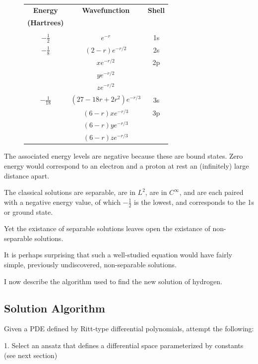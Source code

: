 \documentclass{article}
\begin{document}
\begin{figure}
\begin{center}
\begin{tabular}{ccc}
{\bf Energy}		& {\bf Wavefunction}		& {\bf Shell} \\
{\bf (Hartrees)}	& & \\
\\
$-\frac{1}{2}$		& $e^{-r}$			& 1s \\
$-\frac{1}{8}$		& $(2-r)e^{-r/2}$		& 2s \\
			& $xe^{-r/2}$			& 2p \\
			& $ye^{-r/2}$			\\
			& $ze^{-r/2}$			\\
$-\frac{1}{18}$		& $(27-18r+2r^2)e^{-r/3}$	& 3s \\
			& $(6-r)xe^{-r/3}$		& 3p \\
			& $(6-r)ye^{-r/3}$		\\
			& $(6-r)ze^{-r/3}$		\\
\end{tabular}
\end{center}
\end{figure}

The associated energy levels are negative because these are bound states.  Zero energy
would correspond to an electron and a proton at rest an (infinitely) large distance apart.

The classical solutions are separable, are in $L^2$, are in $C^\infty$,
and are each paired with a negative energy value, of which $-\frac{1}{2}$ is the lowest,
and corresponds to the 1s or ground state.

Yet the existance of separable solutions leaves open the existance of non-separable solutions.

It is perhaps surprising that such a well-studied equation would have fairly simple, previously
undiscovered, non-separable solutions.

I now describe the algorithm used to find the new solution of hydrogen.

\subsection*{Solution Algorithm}

Given a PDE defined by Ritt-type differential polynomials, attempt the following:

1. Select an ansatz that defines a differential space parameterized by constants (see next section)
\end{document}
